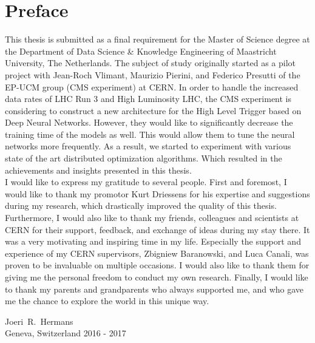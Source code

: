 %
%
%

\newpage
\chapter*{Preface}

This thesis is submitted as a final requirement for the Master of Science degree at the Department of Data Science \& Knowledge Engineering of Maastricht University, The Netherlands. The subject of study originally started as a pilot project with Jean-Roch Vlimant, Maurizio Pierini, and Federico Presutti of the EP-UCM group (CMS experiment) at CERN. In order to handle the increased data rates of LHC Run 3 and High Luminosity LHC, the CMS experiment is considering to construct a new architecture for the High Level Trigger based on Deep Neural Networks. However, they would like to significantly decrease the training time of the models as well. This would allow them to tune the neural networks more frequently. As a result, we started to experiment with various state of the art distributed optimization algorithms. Which resulted in the achievements and insights presented in this thesis.\\

I would like to express my gratitude to several people. First and foremost, I would like to thank my promotor Kurt Driessens for his expertise and suggestions during my research, which drastically improved the quality of this thesis. Furthermore, I would also like to thank my friends, colleagues and scientists at CERN for their support, feedback, and exchange of ideas during my stay there. It was a very motivating and inspiring time in my life. Especially the support and experience of my CERN supervisors, Zbigniew Baranowski, and Luca Canali, was proven to be invaluable on multiple occasions. I would also like to thank them for giving me the personal freedom to conduct my own research. Finally, I would like to thank my parents and grandparents who always supported me, and who gave me the chance to explore the world in this unique way.

\vspace{1cm}
\begin{flushright}
Joeri~R.~Hermans\\
Geneva, Switzerland 2016 - 2017
\end{flushright}
